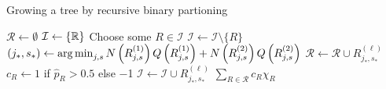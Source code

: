   \begin{algorithm}
    \caption{Growing a tree by recursive binary partioning} \label{alg:tree}
    \begin{algorithmic}[1]
        \State $\mathcal{R} \gets \emptyset$ 
        \State $\mathcal{I} \gets \{ \mathbb{R} \}$ 
          \State Choose some $R \in \mathcal{I}$
          \State $\mathcal{I} \gets \mathcal{I} \setminus \{ R \}$
          \State $(j_*, s_*) \gets \operatorname*{arg\,min}_{j, s} N\left(R_{j,s}^{(1)}\right) Q\left(R_{j,s}^{(1)}\right) + 
            N\left(R_{j,s}^{(2)}\right) Q\left(R_{j,s}^{(2)}\right)$ \label{alg:tree:split}
              \State $\mathcal{R} \gets \mathcal{R} \cup R_{j_*, s_*}^{(\ell)}$
              \State $c_R \gets 1$ if $\hat{p}_R > \num{0.5}$ else \num{-1}
            \Else
              \State $\mathcal{I} \gets \mathcal{I} \cup R_{j_*, s_*}^{(\ell)}$
            \EndIf
          \EndFor
        \EndWhile
        \State \Return $\sum_{R \in \mathcal{R}} c_R \chi_R$
      \EndFunction
    \end{algorithmic}
  \end{algorithm}